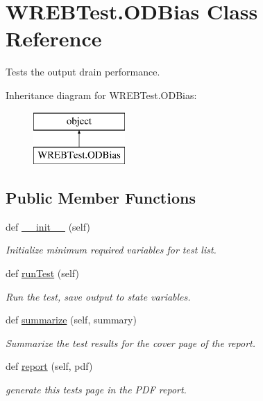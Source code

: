 \hypertarget{class_w_r_e_b_test_1_1_o_d_bias}{}\section{W\+R\+E\+B\+Test.\+O\+D\+Bias Class Reference}
\label{class_w_r_e_b_test_1_1_o_d_bias}


Tests the output drain performance.  


Inheritance diagram for W\+R\+E\+B\+Test.\+O\+D\+Bias\+:\begin{figure}[H]
\begin{center}
\leavevmode
\includegraphics[height=2.000000cm]{class_w_r_e_b_test_1_1_o_d_bias}
\end{center}
\end{figure}
\subsection*{Public Member Functions}
\begin{DoxyCompactItemize}
\item 
def \hyperlink{class_w_r_e_b_test_1_1_o_d_bias_a5ab5511ac55947fbb770513f93ad86c3}{\+\_\+\+\_\+init\+\_\+\+\_\+} (self)
\begin{DoxyCompactList}\small\item\em Initialize minimum required variables for test list. \end{DoxyCompactList}\item 
def \hyperlink{class_w_r_e_b_test_1_1_o_d_bias_a70f5249d1a85164c7f3e59cad8ee23a1}{run\+Test} (self)
\begin{DoxyCompactList}\small\item\em Run the test, save output to state variables. \end{DoxyCompactList}\item 
def \hyperlink{class_w_r_e_b_test_1_1_o_d_bias_af6e5f6d44037247cc05e587cb8c8a642}{summarize} (self, summary)
\begin{DoxyCompactList}\small\item\em Summarize the test results for the cover page of the report. \end{DoxyCompactList}\item 
def \hyperlink{class_w_r_e_b_test_1_1_o_d_bias_a2673bf6c78ee8c050e9b64b47bd95ef4}{report} (self, pdf)
\begin{DoxyCompactList}\small\item\em generate this test\textquotesingle{}s page in the P\+DF report. \end{DoxyCompactList}\end{DoxyCompactItemize}



